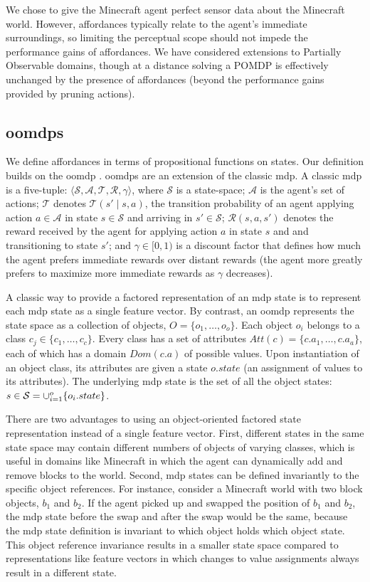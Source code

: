 \documentclass[letterpaper]{article}
\begin{document}
We chose to give the Minecraft agent perfect sensor data about the Minecraft world.
However, affordances typically relate to the agent's immediate surroundings,
so limiting the perceptual scope should not impede the performance gains of affordances.
We have considered extensions to Partially Observable domains, though at a distance
solving a POMDP is effectively unchanged by the presence of affordances (beyond the
performance gains provided by pruning actions).

\subsection{\Glspl{oomdp}}
We define affordances in terms of propositional functions on states. Our definition builds on the \gls{oomdp} \cite{diuk08}.  \glspl{oomdp} are an extension of
the classic \gls{mdp}.  A classic \gls{mdp} is a
five-tuple: $\langle \mathcal{S}, \mathcal{A}, \mathcal{T},
\mathcal{R}, \gamma \rangle$, where $\mathcal{S}$ is a state-space;
$\mathcal{A}$ is the agent's set of actions; $\mathcal{T}$ denotes
$\mathcal{T}(s' \mid s,a)$, the transition probability of an agent
applying action $a \in \mathcal{A}$ in state $s \in \mathcal{S}$ and
arriving in $s' \in \mathcal{S}$; $\mathcal{R}(s,a,s')$ denotes the
reward received by the agent for applying action $a$ in state $s$ and
and transitioning to state $s'$; and $\gamma \in [0, 1)$ is a discount
  factor that defines how much the agent prefers immediate rewards
  over distant rewards (the agent more greatly prefers to maximize
  more immediate rewards as $\gamma$ decreases).

A classic way to provide a factored representation of an \gls{mdp} state is to represent
each \gls{mdp} state as a single feature vector. By contrast, an \gls{oomdp} represents the state space as a collection of objects,
$O = \{o_1, \ldots, o_o \}$.  Each object $o_i$ belongs to a
class $c_j \in  \{c_1, \ldots, c_c\}$. Every class has a set of attributes
$Att(c) = \{c.a_1, \ldots, c.a_a \}$, each of which has a domain $Dom(c.a)$ of possible values.
Upon instantiation of an object class, its attributes are given a state $o.state$
(an assignment of values to its attributes).  The underlying \gls{mdp} state is the set
of all the object states: $s \in {\cal S} = \cup_{i = 1}^o \{o_i.state\}$. 

There are two advantages to using an object-oriented factored state
representation instead of a single feature vector. First, different
states in the same state space may contain different numbers of
objects of varying classes, which is useful in domains like Minecraft
in which the agent can dynamically add and remove blocks to the
world. Second, \gls{mdp} states can be defined invariantly to the specific
object references.  For instance, consider a Minecraft world with two
block objects, $b_1$ and $b_2$.  If the agent picked up and swapped
the position of $b_1$ and $b_2$, the \gls{mdp} state before the swap and
after the swap would be the same, because the \gls{mdp} state definition is
invariant to which object holds which object state. 
This object reference invariance results in a smaller state space compared
to representations like feature vectors in which changes to value
assignments always result in a different state.
\end{document}
